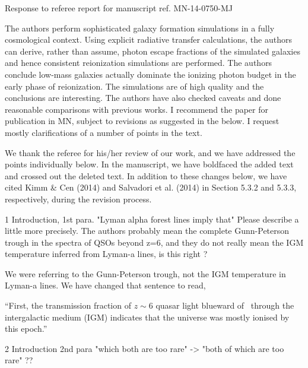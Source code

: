 \documentclass[11pt]{article}
\begin{document}
\begin{center} 
\bfseries{
\begin{large}
  Response to referee report for manuscript ref. MN-14-0750-MJ
\end{large}
}
\end{center}

\begin{referee}
The authors perform sophisticated galaxy formation simulations in a
fully cosmological context. Using explicit radiative transfer
calculations, the authors can derive, rather than assume, photon
escape fractions of the simulated galaxies and hence consistent
reionization simulations are performed. The authors conclude
low-mass galaxies actually dominate the ionizing photon budget in
the early phase of reionization. The simulations are of high quality
and the conclusions are interesting. The authors have also checked
caveats and done reasonable comparisons with previous works. I
recommend the paper for publication in MN, subject to revisions as
suggested in the below. I request mostly clarifications of a number
of points in the text.
\end{referee}

We thank the referee for his/her review of our work, and we have
addressed the points individually below.  In the manuscript, we have
boldfaced the added text and crossed out the deleted text.  In
addition to these changes below, we have cited Kimm \& Cen (2014) and
Salvadori et al. (2014) in Section 5.3.2 and 5.3.3, respectively,
during the revision process.

\begin{referee}
1 Introduction, 1st para.
"Lyman alpha forest lines imply that"
Please describe a little more precisely.
The authors probably mean the complete Gunn-Peterson
trough in the spectra of QSOs beyond z=6, and they do
not really mean  the IGM temperature inferred from Lyman-a
lines, is this right ?
\end{referee}

We were referring to the Gunn-Peterson trough, not the IGM temperature
in Lyman-a lines.  We have changed that sentence to read,

``First, the transmission fraction of $z \sim 6$ quasar light blueward
of \lya~through the intergalactic medium (IGM) indicates that the
universe was mostly ionised by this epoch.''

\begin{referee}
2 Introduction 2nd para
"which both are too rare"
-> "both of which are too rare" ??
\end{referee}
\end{document}
